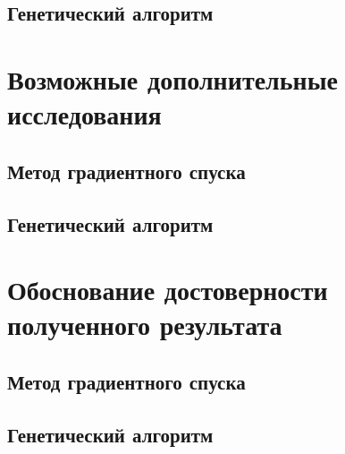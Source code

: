 \documentclass[10pt,a4paper,titlepage]{article}
\begin{document}
\subsection{Генетический алгоритм}

\section{Возможные дополнительные исследования}
\subsection{Метод градиентного спуска}

\subsection{Генетический алгоритм}

\section{Обоснование достоверности полученного результата}
\subsection{Метод градиентного спуска}

\subsection{Генетический алгоритм}
\end{document}
